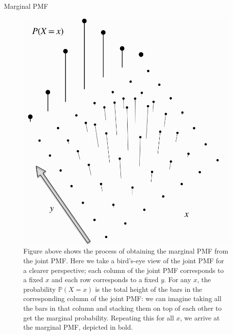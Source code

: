 \documentclass[8pt, usepdftitle = false]{beamer}
\begin{document}
\begin{frame}{Marginal PMF}
\begin{figure}
  \includegraphics[scale = .25]{Images/marginal_PMF.png}
    \caption{Figure above shows the process of obtaining the marginal PMF from the joint PMF. Here we take a bird's-eye view of the joint PMF for a clearer perspective; each column of the joint PMF corresponds to a fixed $x$ and each row corresponds to a fixed $y$. For any $x$, the probability $\mathbb{P}(X=x)$ is the total height of the bars in the corresponding column of the joint PMF: we can imagine taking all the bars in that column and stacking them on top of each other to get the marginal probability. Repeating this for all $x$, we arrive at the marginal PMF, depicted in bold.}
\end{figure}

\end{frame}
\end{document}
